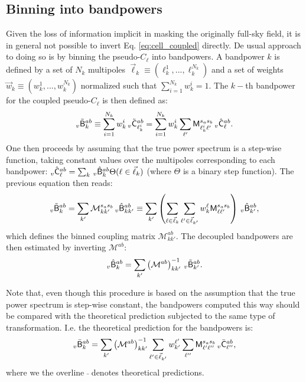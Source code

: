 \documentclass[a4paper,10pt]{article}
\begin{document}
\subsection{Binning into bandpowers}
  Given the loss of information implicit in masking the originally full-sky field, it is in general not possible to invert Eq. \ref{eq:cell_coupled} directly. De usual approach to doing so is by binning the pseudo-$C_\ell$ into bandpowers. A bandpower $k$ is defined by a set of $N_k$ multipoles $\vec{\ell}_k\equiv(\ell_k^1,...,\ell_k^{N_k})$ and a set of weights $\vec{w}_k\equiv(w_k^1,...,w_k^{N_k})$ normalized such that $\sum_{i=1}^{N_k}w_k^i=1$. The $k-$th bandpower for the coupled pseudo-$C_\ell$ is then defined as:
  \begin{equation}
    _v\tilde{\sf B}^{ab}_k\equiv\sum_{i=1}^{N_k}w_k^i\,_v\tilde{\sf C}^{ab}_{\ell_k^i}
    =\sum_{i=1}^{N_k}w_k^i\sum_{\ell'}{\sf M}^{s_as_b}_{\ell_k^i\ell'}\,_v\hat{\sf C}^{ab}_\ell.
  \end{equation}
  One then proceeds by assuming that the true power spectrum is a step-wise function, taking constant values over the multipoles corresponding to each bandpower: $_v\hat{\sf C}^{ab}_\ell=\sum_k\,_v\hat{\sf B}^{ab}_k\Theta(\ell\in\vec{\ell}_k)$ (where $\Theta$ is a binary step function). The previous equation then reads:
  \begin{equation}
   _v\tilde{\sf B}^{ab}_k=\sum_{k'}\mathcal{M}^{s_as_b}_{kk'}\,_v\hat{\sf B}^{ab}_{kk'}\equiv\sum_{k'}\left(\sum_{\ell\in\vec{\ell}_k}\sum_{\ell'\in\vec{\ell}_{k'}}w_k^\ell{\sf M}^{s_as_b}_{\ell\ell'}\right)\,_v\hat{\sf B}^{ab}_{k'},
  \end{equation}
  which defines the binned coupling matrix $\mathcal{M}^{ab}_{kk'}$. The decoupled bandpowers are then estimated by inverting $\mathcal{M}^{ab}$:
  \begin{equation}
    _v\hat{\sf B}^{ab}_k=\sum_{k'}\left(\mathcal{M}^{ab}\right)^{-1}_{kk'}\,_v\tilde{\sf B}^{ab}_{k'}.
  \end{equation}

  Note that, even though this procedure is based on the assumption that the true power spectrum is step-wise constant, the bandpowers computed this way should be compared with the theoretical prediction subjected to the same type of transformation. I.e. the theoretical prediction for the bandpowers is:
  \begin{equation}
    _v\bar{\sf B}^{ab}_k=\sum_{k'}\left(\mathcal{M}^{ab}\right)^{-1}_{kk'}\sum_{\ell'\in\vec{\ell}_{k'}}w_{k'}^{\ell'}\sum_{\ell''}{\sf M}^{s_as_b}_{\ell'\ell''}\,_v\bar{\sf C}^{ab}_{\ell''},
  \end{equation}
  where we the overline $\bar{\,}$ denotes theoretical predictions.
\end{document}
